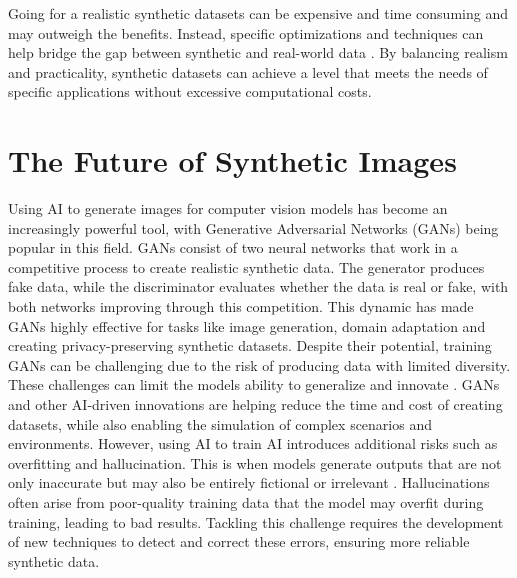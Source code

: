 \noindent Going for a realistic synthetic datasets can be expensive and time consuming and may outweigh the benefits. Instead, specific optimizations and techniques can help bridge the gap between synthetic and real-world data \cite{nikolenko2021synthetic, jimaging8110310}. By balancing realism and practicality, synthetic datasets can achieve a level that meets the needs of specific applications without excessive computational costs.


\section{The Future of Synthetic Images}
\label{gan}
Using AI to generate images for computer vision models has become an increasingly powerful tool, with Generative Adversarial Networks (GANs) being popular in this field. GANs consist of two neural networks that work in a competitive process to create realistic synthetic data. The generator produces fake data, while the discriminator evaluates whether the data is real or fake, with both networks improving through this competition. This dynamic has made GANs highly effective for tasks like image generation, domain adaptation and creating privacy-preserving synthetic datasets. Despite their potential, training GANs can be challenging due to the risk of producing data with limited diversity. These challenges can limit the models ability to generalize and innovate \cite{gan}. GANs and other AI-driven innovations are helping reduce the time and cost of creating datasets, while also enabling the simulation of complex scenarios and environments. However, using AI to train AI introduces additional risks such as overfitting and hallucination. This is when models generate outputs that are not only inaccurate but may also be entirely fictional or irrelevant \cite{hallucination}. Hallucinations often arise from poor-quality training data that the model may overfit during training, leading to bad results. Tackling this challenge requires the development of new techniques to detect and correct these errors, ensuring more reliable synthetic data.
